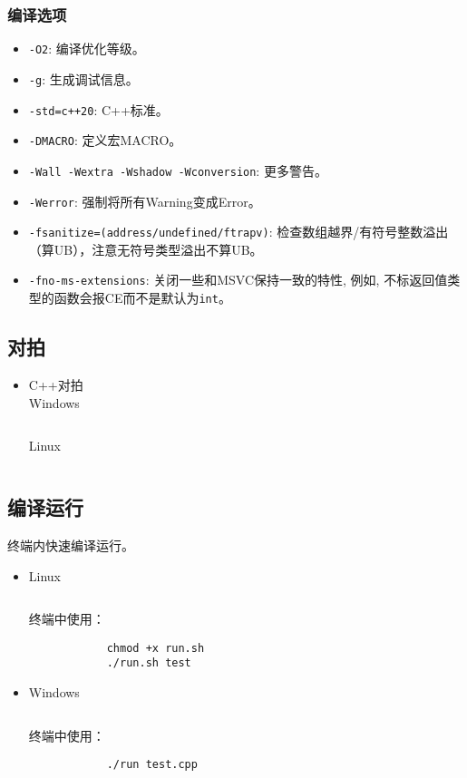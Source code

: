 \documentclass[a4paper, twoside]{article}
\begin{document}
    \subsubsection{编译选项}
    \begin{itemize}
        \item \texttt{-O2}: 编译优化等级。
        \item \texttt{-g}: 生成调试信息。
        \item \texttt{-std=c++20}: C++标准。
        \item \texttt{-DMACRO}: 定义宏MACRO。
        \item \texttt{-Wall -Wextra -Wshadow -Wconversion}: 更多警告。
        \item \texttt{-Werror}: 强制将所有Warning变成Error。
        \item \texttt{-fsanitize=(address/undefined/ftrapv)}: 检查数组越界/有符号整数溢出（算UB），注意无符号类型溢出不算UB。
        \item \texttt{-fno-ms-extensions}: 关闭一些和MSVC保持一致的特性, 例如, 不标返回值类型的函数会报CE而不是默认为\texttt{int}。
    \end{itemize}

\subsection{对拍}
\begin{itemize}
    \item C++对拍\\
    Windows
    \inputminted{cpp}{../src/附录/C++对拍（Windows）.cpp}

    Linux
    \inputminted{cpp}{../src/附录/C++对拍（Linux）.cpp}
\end{itemize}

\subsection{编译运行}
    终端内快速编译运行。
    \begin{itemize}
        \item Linux
        \inputminted{bash}{../src/附录/Linux编译运行脚本.sh}
        终端中使用：
        \begin{verbatim}
            chmod +x run.sh
            ./run.sh test        
        \end{verbatim}
        \item Windows
        \inputminted{batch}{../src/附录/Windows编译运行脚本.bat}
        终端中使用：
        \begin{verbatim}
            ./run test.cpp     
        \end{verbatim}
    \end{itemize}
\end{document}
